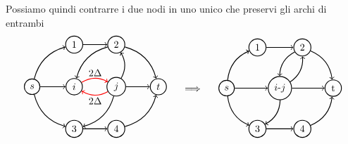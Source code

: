 \documentclass[a4paper, 11pt]{report}
\begin{document}
Possiamo quindi contrarre i due nodi in uno unico che preservi gli archi di entrambi
\[\begin{tabular}{ccc}
    \begin{tikzpicture}[node distance={15mm}, thick , main/.style = {draw, circle}] 
    

    \node[main] (0) {$s$};
    \node[main] (3) [right of= 0 ] {$i$};
    \node[main] (4) [right of=3] {$j$};
    \node[main] (1) [below of = 3 ] {3};
    \node[main] (2) [above of = 3] {$1$};
    
    \node[main] (6) [above of=4] {$2$};
    \node[main] (5) [below of=4] {$4$};
    \node[main] (7) [right of=4] {$t$};
    \draw[->] (0) [bend right] to (1);
    \draw[->] (0) [bend left] to (2);
    \draw[->] (0) to (3);
    \draw[->] (3) [red, bend left] to (4);
    \node at (2.25,0.5) {$2\Delta$};
    \node at (2.25,-0.5) {$2\Delta$};
    \draw[->] (4) [red, bend left] to (3);
    
    \draw[->] (2) to (6);
    \draw[->] (4)[bend left] to (1);
    \draw[->] (4)[bend right] to (6);
    \draw[->] (6)[bend right] to (3);
    \draw[->] (4) to (7);
    \draw[->] (1) to (5);
    \draw[->] (6)[bend left] to (7);
    \draw[->] (5)[bend right] to (7);


\end{tikzpicture}&\begin{tikzpicture}
    \node {$\implies$};%
    \node at (0,1.4) {};
    \node at (0,-1.6) {};
\end{tikzpicture}  &
\begin{tikzpicture}[node distance={19mm}, thick , main/.style = {draw, circle}] 
    
    
    \node[main] (m)  {$i$-$j$};
    \node[main] (0) [left of = m ]{$s$};
    \node[main] (1) at (-0.8,1.45) {1};
    
    \node[main] (2) at (0.8,1.45) {$2$};

    \node[main] (3) at (-0.8,-1.45) {$3$};
    \node[main] (4) at (0.8,-1.45) {$4$};

    \node[main] (5) [right of = m] {t};

    
    \draw[->] (0) to (m);
    \draw[->] (0)[bend left] to (1);
    \draw[->] (0)[bend right] to (3);

    \draw[->] (1) to (2);

    \draw[->] (2)[bend right] to (m);
    \draw[->] (m)[bend right] to (2);
    \draw[->] (m)[bend left] to (3);
    \draw[->] (2)[bend left] to (5);
    \draw[->] (m) to (5);
    \draw[->] (3) to (4);  
    \draw[->] (4)[bend right] to (5);

\end{tikzpicture}
\end{tabular}\]
\end{document}
